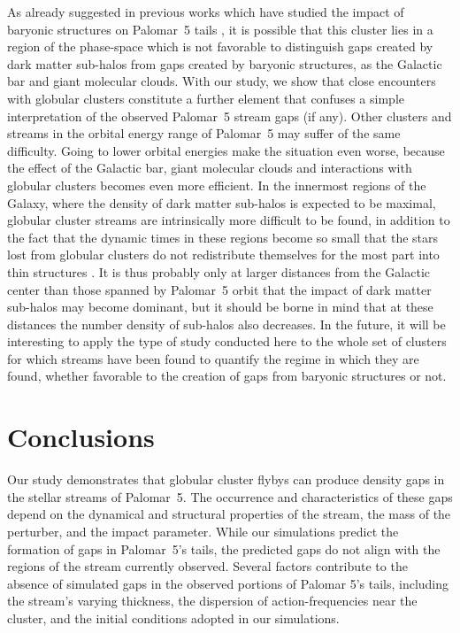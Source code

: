 \documentclass{aa}
\begin{document}
  As already suggested in previous works which have studied the impact of baryonic structures on Palomar~5 tails \citep{2017NatAs...1..633P, 2019MNRAS.484.2009B}, it is possible that this cluster lies in a region of the phase-space which is not favorable to distinguish gaps created by dark matter sub-halos from gaps created by baryonic structures, as the Galactic bar and giant molecular clouds. With our study, we show that close encounters with globular clusters constitute a further element that confuses a simple interpretation of the observed Palomar~5 stream gaps (if any). Other clusters and streams in the orbital energy range of Palomar~5 may suffer of the same difficulty. Going to lower orbital energies make the situation even worse, because the effect of the Galactic bar, giant molecular clouds and interactions with globular clusters becomes even more efficient. In the innermost regions of the Galaxy, where the density of dark matter sub-halos is expected to be maximal, globular cluster streams are intrinsically more difficult to be found, in addition to the fact that the dynamic times in these regions become so small that the stars lost from globular clusters do not redistribute themselves for the most part into thin structures \citep[see][]{2023A&A...673A..44F}. It is thus probably only at larger distances from the Galactic center than those spanned by Palomar~5 orbit that the impact of dark matter sub-halos may become dominant, but it should be borne in mind that at these distances the number density of sub-halos also decreases. In the future, it will be interesting to apply the type of study conducted here to the whole set of clusters for which streams have been found to quantify the regime in which they are found, whether favorable to the creation of gaps from baryonic structures or not.
  

  
\section{Conclusions}
  Our study demonstrates that globular cluster flybys can produce density gaps in the stellar streams of Palomar~5. The occurrence and characteristics of these gaps depend on the dynamical and structural properties of the stream, the mass of the perturber, and the impact parameter. While our simulations predict the formation of gaps in Palomar~5's tails, the predicted gaps do not align with the regions of the stream currently observed. Several factors contribute to the absence of simulated gaps in the observed portions of Palomar 5's tails, including the stream's varying thickness, the dispersion of action-frequencies near the cluster, and the initial conditions adopted in our simulations. 
\end{document}
